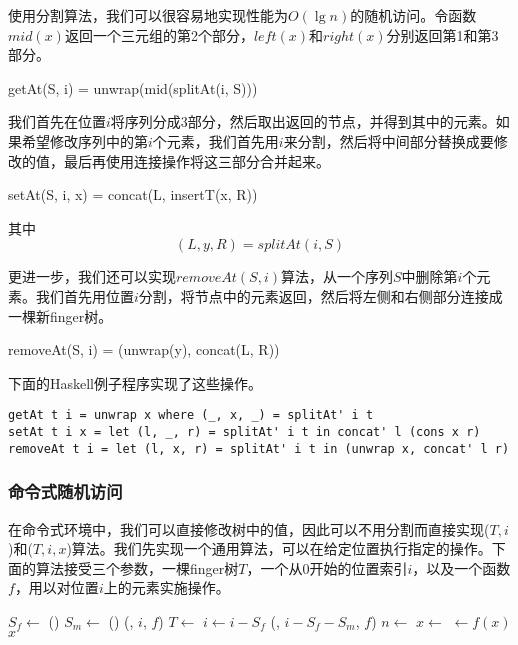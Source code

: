 \documentclass[UTF8]{article}
\begin{document}
使用分割算法，我们可以很容易地实现性能为$O(\lg n)$的随机访问。令函数$mid(x)$返回一个三元组的第2个部分，$left(x)$和$right(x)$分别返回第1和第3部分。

\be
getAt(S, i) = unwrap(mid(splitAt(i, S)))
\ee

我们首先在位置$i$将序列分成3部分，然后取出返回的节点，并得到其中的元素。如果希望修改序列中的第$i$个元素，我们首先用$i$来分割，然后将中间部分替换成要修改的值，最后再使用连接操作将这三部分合并起来。

\be
setAt(S, i, x) = concat(L, insertT(x, R))
\ee

其中
\[
(L, y, R) = splitAt(i, S)
\]

更进一步，我们还可以实现$removeAt(S, i)$算法，从一个序列$S$中删除第$i$个元素。我们首先用位置$i$分割，将节点中的元素返回，然后将左侧和右侧部分连接成一棵新finger树。

\be
removeAt(S, i) = (unwrap(y), concat(L, R))
\ee

下面的Haskell例子程序实现了这些操作。

\lstset{language=Haskell}
\begin{lstlisting}[style=Haskell]
getAt t i = unwrap x where (_, x, _) = splitAt' i t
setAt t i x = let (l, _, r) = splitAt' i t in concat' l (cons x r)
removeAt t i = let (l, x, r) = splitAt' i t in (unwrap x, concat' l r)
\end{lstlisting}

\subsubsection{命令式随机访问}

在命令式环境中，我们可以直接修改树中的值，因此可以不用分割而直接实现($T, i$)和($T, i, x$)算法。我们先实现一个通用算法，可以在给定位置执行指定的操作。下面的算法接受三个参数，一棵finger树$T$，一个从0开始的位置索引$i$，以及一个函数$f$，用以对位置$i$上的元素实施操作。

\begin{algorithmic}
    \State $S_f \gets $ ()
    \State $S_m \gets $ ()
      \State \Return {}(, $i$, $f$)
      \State $T \gets$ 
      \State $i \gets i - S_f$
    \Else
      \State \Return {}(, $i - S_f - S_m$, $f$)
    \EndIf
  \EndWhile
  \State $n \gets$ 
  \State $x \gets$ 
  \State {} $\gets f(x)$
  \State \Return $x$
\EndFunction
\end{algorithmic}
\end{document}
